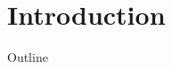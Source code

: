 \documentclass{beamer}
\begin{document}
\section{Introduction}
% 
% 
\begin{frame}{Outline}
\tableofcontents[hideallsubsections]
\end{frame}
\end{document}
